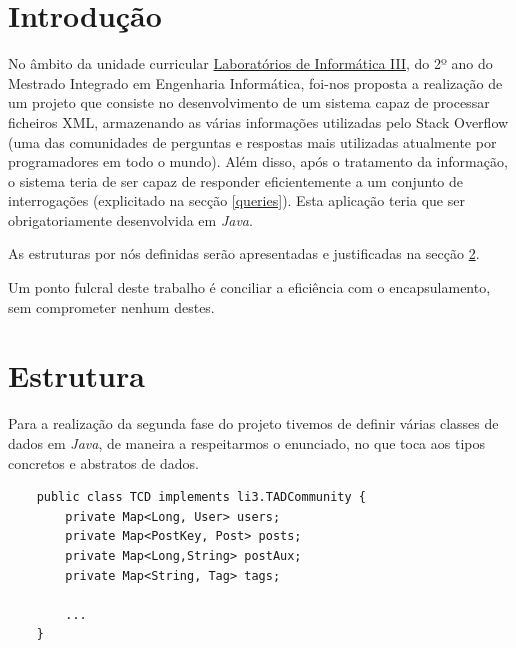 \documentclass[a4paper, 11pt, oneside]{article}
\begin{document}

\tableofcontents

\newpage


\section{Introdução}

No âmbito da unidade curricular \underline{Laboratórios de Informática III}, do 2º ano do Mestrado Integrado em Engenharia Informática, foi-nos proposta a realização de
um projeto que consiste no desenvolvimento de um sistema capaz de processar ficheiros XML, armazenando as várias informações utilizadas pelo Stack Overflow (uma das 
comunidades de perguntas e respostas mais utilizadas atualmente por programadores em todo o mundo). Além disso, após o tratamento da informação, o sistema teria de ser capaz 
de responder eficientemente a um conjunto de interrogações (explicitado na secção \ref{queries}). Esta aplicação teria que ser obrigatoriamente desenvolvida em \textit{Java}.

As estruturas por nós definidas serão apresentadas e justificadas na secção \ref{structs}.

Um ponto fulcral deste trabalho é conciliar a eficiência com o encapsulamento, sem comprometer nenhum destes.





\newpage
\section{Estrutura}
\label{structs}

Para a realização da segunda fase do projeto tivemos de definir várias classes de dados em \textit{Java}, de maneira a respeitarmos o enunciado, no que toca aos tipos 
concretos e abstratos de dados.



\begin{lstlisting}
	public class TCD implements li3.TADCommunity {
	    private Map<Long, User> users;
	    private Map<PostKey, Post> posts;
	    private Map<Long,String> postAux;
	    private Map<String, Tag> tags;

	    ...
	}
\end{lstlisting}
\end{document}

